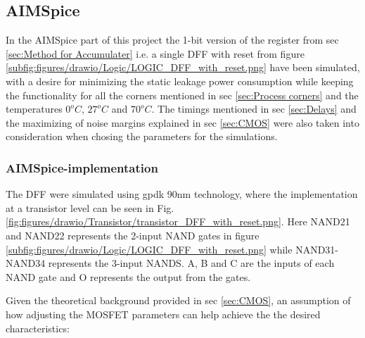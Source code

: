 \subsection{AIMSpice}
In the AIMSpice part of this project the 1-bit version of the register from sec \ref{sec:Method for Accumulater} i.e. a single DFF with reset from figure \ref{subfig:figures/drawio/Logic/LOGIC_DFF_with_reset.png} have been simulated, with a desire for minimizing the static leakage power consumption while keeping the functionality for all the corners mentioned in sec \ref{sec:Process corners} and the temperatures $0^o C$, $27^o C$ and $70^o C$. The timings mentioned in sec \ref{sec:Delays} and the maximizing of noise margins explained in sec \ref{sec:CMOS} were also taken into consideration when chosing the parameters for the simulations.

\subsubsection{AIMSpice-implementation}
The DFF were simulated using gpdk 90nm technology, where the implementation at a transistor level can be seen in Fig. \ref{fig:figures/drawio/Transistor/transistor_DFF_with_reset.png}. Here NAND21 and NAND22 represents the 2-input NAND gates in figure \ref{subfig:figures/drawio/Logic/LOGIC_DFF_with_reset.png} while NAND31-NAND34 represents the 3-input NANDS. A, B and C are the inputs of each NAND gate and O represents the output from the gates.


Given the theoretical background provided in sec \ref{sec:CMOS}, an assumption of how  adjusting the MOSFET parameters can help achieve the the desired characteristics:

